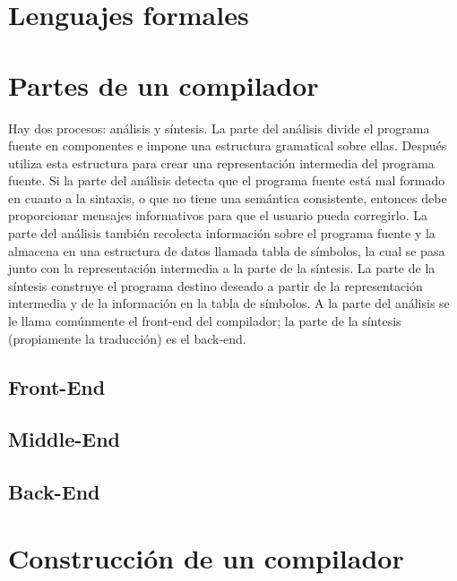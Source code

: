 \section{Lenguajes formales}

\section{Partes de un compilador}

Hay dos procesos: análisis y síntesis. La parte del análisis divide el programa fuente en componentes e impone una estructura gramatical sobre ellas. Después utiliza esta estructura para crear una representación intermedia del programa fuente. Si la parte del análisis detecta que el programa fuente está mal formado en cuanto a la sintaxis, o que no tiene una semántica consistente, entonces debe proporcionar mensajes informativos para que el usuario pueda corregirlo. La parte del análisis también recolecta información sobre el programa fuente y la almacena en una estructura de datos llamada tabla de símbolos, la cual se pasa junto con la representación intermedia a la parte de la síntesis. La parte de la síntesis construye el programa destino deseado a partir de la representación intermedia y de la información en la tabla de símbolos. A la parte del análisis se le llama comúnmente el front-end del compilador; la parte de la síntesis (propiamente la traducción) es el back-end.

\subsection{Front-End}
\subsection{Middle-End}
\subsection{Back-End}

\section{Construcción de un compilador}



